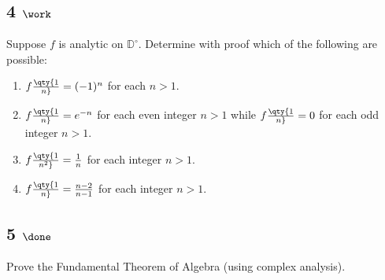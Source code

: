 \hypertarget{work-37}{%
\subsection{\texorpdfstring{4
\(\work\)}{4 \textbackslash work}}\label{work-37}}

Suppose \(f\) is analytic on \({\mathbb{D}}^\circ\). Determine with
proof which of the following are possible:

\begin{enumerate}
\def\labelenumi{\alph{enumi}.}
\item
  \(f\qty{1\over n} = (-1)^n\) for each \(n>1\).
\item
  \(f\qty{1\over n} = e^{-n}\) for each even integer \(n>1\) while
  \(f\qty{1\over n} = 0\) for each odd integer \(n>1\).
\item
  \(f\qty{1\over n^2} = {1\over n}\) for each integer \(n>1\).
\item
  \(f\qty{1\over n} = {n-2 \over n-1}\) for each integer \(n>1\).
\end{enumerate}

\hypertarget{done-4}{%
\subsection{\texorpdfstring{5
\(\done\)}{5 \textbackslash done}}\label{done-4}}

Prove the Fundamental Theorem of Algebra (using complex analysis).

